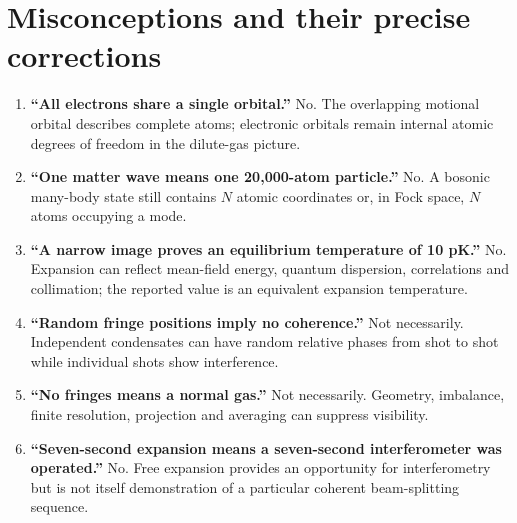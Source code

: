 \documentclass[11pt,a4paper]{article}
\begin{document}
\section{Misconceptions and their precise corrections}
\begin{enumerate}[leftmargin=*,itemsep=4pt]
\item \textbf{``All electrons share a single orbital.''} No. The overlapping motional orbital describes complete atoms; electronic orbitals remain internal atomic degrees of freedom in the dilute-gas picture.
\item \textbf{``One matter wave means one 20,000-atom particle.''} No. A bosonic many-body state still contains $N$ atomic coordinates or, in Fock space, $N$ atoms occupying a mode.
\item \textbf{``A narrow image proves an equilibrium temperature of 10 pK.''} No. Expansion can reflect mean-field energy, quantum dispersion, correlations and collimation; the reported value is an equivalent expansion temperature.
\item \textbf{``Random fringe positions imply no coherence.''} Not necessarily. Independent condensates can have random relative phases from shot to shot while individual shots show interference.
\item \textbf{``No fringes means a normal gas.''} Not necessarily. Geometry, imbalance, finite resolution, projection and averaging can suppress visibility.
\item \textbf{``Seven-second expansion means a seven-second interferometer was operated.''} No. Free expansion provides an opportunity for interferometry but is not itself demonstration of a particular coherent beam-splitting sequence.
\end{enumerate}
\end{document}
